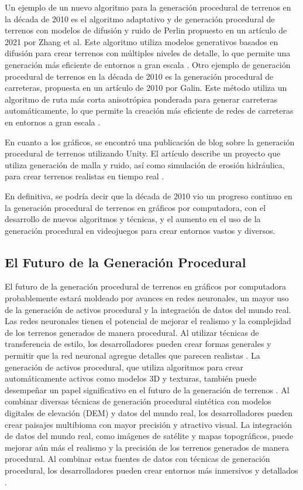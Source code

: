 Un ejemplo de un nuevo algoritmo para la generación procedural de terrenos en la década de 2010 es el algoritmo adaptativo y de generación procedural de terrenos con modelos de difusión y ruido de Perlin propuesto en un artículo de 2021 por Zhang et al. Este algoritmo utiliza modelos generativos basados en difusión para crear terrenos con múltiples niveles de detalle, lo que permite una generación más eficiente de entornos a gran escala \cite{AdaptiveandMulti-resolutionProcedurtalInfiniteTerrain}. Otro ejemplo de generación procedural de terrenos en la década de 2010 es la generación procedural de carreteras, propuesta en un artículo de 2010 por Galin. Este método utiliza un algoritmo de ruta más corta anisotrópica ponderada para generar carreteras automáticamente, lo que permite la creación más eficiente de redes de carreteras en entornos a gran escala \cite{ProceduralGenerationRoads}.

En cuanto a los gráficos, se encontró una publicación de blog sobre la generación procedural de terrenos utilizando Unity. El artículo describe un proyecto que utiliza generación de malla y ruido, así como simulación de erosión hidráulica, para crear terrenos realistas en tiempo real \cite{ProceduralTerrainGeneration}.

En definitiva, se podría decir que la década de 2010 vio un progreso continuo en la generación procedural de terrenos en gráficos por computadora, con el desarrollo de nuevos algoritmos y técnicas, y el aumento en el uso de la generación procedural en videojuegos para crear entornos vastos y diversos.

\subsection{El Futuro de la Generación Procedural} 

El futuro de la generación procedural de terrenos en gráficos por computadora probablemente estará moldeado por avances en redes neuronales, un mayor uso de la generación de activos procedural y la integración de datos del mundo real. Las redes neuronales tienen el potencial de mejorar el realismo y la complejidad de los terrenos generados de manera procedural. Al utilizar técnicas de transferencia de estilo, los desarrolladores pueden crear formas generales y permitir que la red neuronal agregue detalles que parecen realistas \cite{StyleTransfer}. La generación de activos procedural, que utiliza algoritmos para crear automáticamente activos como modelos 3D y texturas, también puede desempeñar un papel significativo en el futuro de la generación de terrenos \cite{RealWorldDataTerrain}. Al combinar diversas técnicas de generación procedural sintética con modelos digitales de elevación (DEM) y datos del mundo real, los desarrolladores pueden crear paisajes multibioma con mayor precisión y atractivo visual. La integración de datos del mundo real, como imágenes de satélite y mapas topográficos, puede mejorar aún más el realismo y la precisión de los terrenos generados de manera procedural. Al combinar estas fuentes de datos con técnicas de generación procedural, los desarrolladores pueden crear entornos más inmersivos y detallados \cite{ProceduralTerrainGenerator}.

